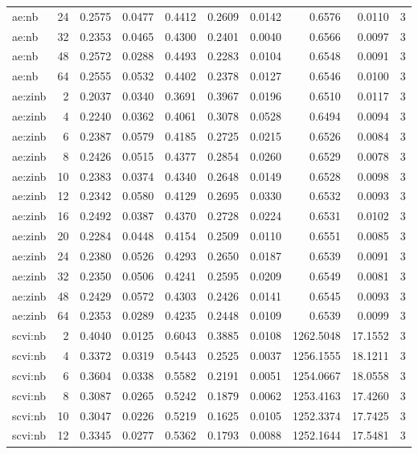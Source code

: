 \begin{tabular}{lrrrrrrrrr}
ae:nb & 24 & 0.2575 & 0.0477 & 0.4412 & 0.2609 & 0.0142 & 0.6576 & 0.0110 & 3 \\
ae:nb & 32 & 0.2353 & 0.0465 & 0.4300 & 0.2401 & 0.0040 & 0.6566 & 0.0097 & 3 \\
ae:nb & 48 & 0.2572 & 0.0288 & 0.4493 & 0.2283 & 0.0104 & 0.6548 & 0.0091 & 3 \\
ae:nb & 64 & 0.2555 & 0.0532 & 0.4402 & 0.2378 & 0.0127 & 0.6546 & 0.0100 & 3 \\
ae:zinb & 2 & 0.2037 & 0.0340 & 0.3691 & 0.3967 & 0.0196 & 0.6510 & 0.0117 & 3 \\
ae:zinb & 4 & 0.2240 & 0.0362 & 0.4061 & 0.3078 & 0.0528 & 0.6494 & 0.0094 & 3 \\
ae:zinb & 6 & 0.2387 & 0.0579 & 0.4185 & 0.2725 & 0.0215 & 0.6526 & 0.0084 & 3 \\
ae:zinb & 8 & 0.2426 & 0.0515 & 0.4377 & 0.2854 & 0.0260 & 0.6529 & 0.0078 & 3 \\
ae:zinb & 10 & 0.2383 & 0.0374 & 0.4340 & 0.2648 & 0.0149 & 0.6528 & 0.0098 & 3 \\
ae:zinb & 12 & 0.2342 & 0.0580 & 0.4129 & 0.2695 & 0.0330 & 0.6532 & 0.0093 & 3 \\
ae:zinb & 16 & 0.2492 & 0.0387 & 0.4370 & 0.2728 & 0.0224 & 0.6531 & 0.0102 & 3 \\
ae:zinb & 20 & 0.2284 & 0.0448 & 0.4154 & 0.2509 & 0.0110 & 0.6551 & 0.0085 & 3 \\
ae:zinb & 24 & 0.2380 & 0.0526 & 0.4293 & 0.2650 & 0.0187 & 0.6539 & 0.0091 & 3 \\
ae:zinb & 32 & 0.2350 & 0.0506 & 0.4241 & 0.2595 & 0.0209 & 0.6549 & 0.0081 & 3 \\
ae:zinb & 48 & 0.2429 & 0.0572 & 0.4303 & 0.2426 & 0.0141 & 0.6545 & 0.0093 & 3 \\
ae:zinb & 64 & 0.2353 & 0.0289 & 0.4235 & 0.2448 & 0.0109 & 0.6539 & 0.0099 & 3 \\
scvi:nb & 2 & 0.4040 & 0.0125 & 0.6043 & 0.3885 & 0.0108 & 1262.5048 & 17.1552 & 3 \\
scvi:nb & 4 & 0.3372 & 0.0319 & 0.5443 & 0.2525 & 0.0037 & 1256.1555 & 18.1211 & 3 \\
scvi:nb & 6 & 0.3604 & 0.0338 & 0.5582 & 0.2191 & 0.0051 & 1254.0667 & 18.0558 & 3 \\
scvi:nb & 8 & 0.3087 & 0.0265 & 0.5242 & 0.1879 & 0.0062 & 1253.4163 & 17.4260 & 3 \\
scvi:nb & 10 & 0.3047 & 0.0226 & 0.5219 & 0.1625 & 0.0105 & 1252.3374 & 17.7425 & 3 \\
scvi:nb & 12 & 0.3345 & 0.0277 & 0.5362 & 0.1793 & 0.0088 & 1252.1644 & 17.5481 & 3 \\

\end{tabular}
